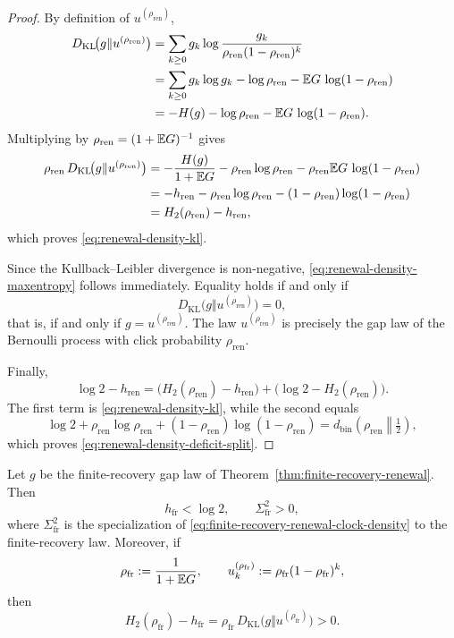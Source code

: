 \begin{proof}
By definition of $u^{(\rho_{\mathrm{ren}})}$,
\begin{align*}
D_{\mathrm{KL}}\!\bigl(g\Vert u^{(\rho_{\mathrm{ren}})}\bigr)
&=
\sum_{k\ge 0}g_k\log\frac{g_k}{\rho_{\mathrm{ren}}(1-\rho_{\mathrm{ren}})^k}\\
&=
\sum_{k\ge 0}g_k\log g_k
-\log\rho_{\mathrm{ren}}
-\mathbb{E} G\,\log(1-\rho_{\mathrm{ren}})\\
&=
-H(g)-\log\rho_{\mathrm{ren}}
-\mathbb{E} G\,\log(1-\rho_{\mathrm{ren}}).
\end{align*}
Multiplying by $\rho_{\mathrm{ren}}=(1+\mathbb{E} G)^{-1}$ gives
\begin{align*}
\rho_{\mathrm{ren}}\,
D_{\mathrm{KL}}\!\bigl(g\Vert u^{(\rho_{\mathrm{ren}})}\bigr)
&=
-\frac{H(g)}{1+\mathbb{E} G}
-\rho_{\mathrm{ren}}\log\rho_{\mathrm{ren}}
-\rho_{\mathrm{ren}}\mathbb{E} G\,\log(1-\rho_{\mathrm{ren}})\\
&=
-h_{\mathrm{ren}}
-\rho_{\mathrm{ren}}\log\rho_{\mathrm{ren}}
-(1-\rho_{\mathrm{ren}})\log(1-\rho_{\mathrm{ren}})\\
&=
H_2(\rho_{\mathrm{ren}})-h_{\mathrm{ren}},
\end{align*}
which proves \eqref{eq:renewal-density-kl}.

Since the Kullback--Leibler divergence is non-negative, \eqref{eq:renewal-density-maxentropy} follows immediately. Equality holds if and only if
\[
D_{\mathrm{KL}}\!\bigl(g\Vert u^{(\rho_{\mathrm{ren}})}\bigr)=0,
\]
that is, if and only if $g=u^{(\rho_{\mathrm{ren}})}$. The law $u^{(\rho_{\mathrm{ren}})}$ is precisely the gap law of the Bernoulli process with click probability $\rho_{\mathrm{ren}}$.

Finally,
\[
\log 2-h_{\mathrm{ren}}
=
\bigl(H_2(\rho_{\mathrm{ren}})-h_{\mathrm{ren}}\bigr)
+
\bigl(\log 2-H_2(\rho_{\mathrm{ren}})\bigr).
\]
The first term is \eqref{eq:renewal-density-kl}, while the second equals
\[
\log 2+\rho_{\mathrm{ren}}\log\rho_{\mathrm{ren}}
+(1-\rho_{\mathrm{ren}})\log(1-\rho_{\mathrm{ren}})
=
d_{\mathrm{bin}}\!\left(\rho_{\mathrm{ren}}\middle\Vert \tfrac12\right),
\]
which proves \eqref{eq:renewal-density-deficit-split}.
\end{proof}

\begin{corollary}\label{cor:finite-recovery-jitter-barrier}
Let $g$ be the finite-recovery gap law of Theorem~\ref{thm:finite-recovery-renewal}. Then
\begin{equation}\label{eq:finite-recovery-jitter-barrier}
h_{\mathrm{fr}}<\log 2,
\qquad
\Sigma_{\mathrm{fr}}^2>0,
\end{equation}
where $\Sigma_{\mathrm{fr}}^2$ is the specialization of \eqref{eq:finite-recovery-renewal-clock-density} to the finite-recovery law.
Moreover, if
\[
\rho_{\mathrm{fr}}
:=
\frac{1}{1+\mathbb{E} G},
\qquad
u^{(\rho_{\mathrm{fr}})}_k:=\rho_{\mathrm{fr}}(1-\rho_{\mathrm{fr}})^k,
\]
then
\begin{equation}\label{eq:finite-recovery-memory-penalty}
H_2(\rho_{\mathrm{fr}})-h_{\mathrm{fr}}
=
\rho_{\mathrm{fr}}\,D_{\mathrm{KL}}\!\bigl(g\Vert u^{(\rho_{\mathrm{fr}})}\bigr)
>0.
\end{equation}
\end{corollary}

